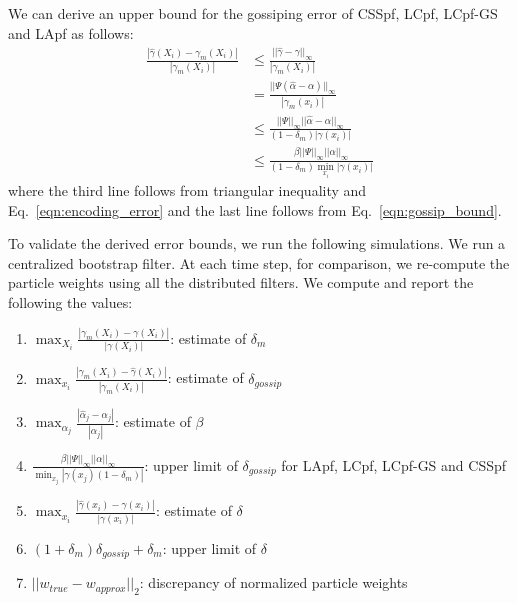\documentclass[10pt,letterpaper,final]{article}
\begin{document}

We can derive an upper bound for the gossiping error of CSSpf, LCpf, LCpf-GS and LApf as follows: 
\begin{align}
\frac{|\hat{\gamma}(X_i)-\gamma_m(X_i)|}{|\gamma_m(X_i)|} &\leq  \frac{||\hat{\gamma}-\gamma ||_\infty}{|\gamma_m(X_i)|} \nonumber \\
&= \frac{||\Psi (\hat{\alpha}-\alpha) ||_\infty}{|\gamma_m(x_i)|} \nonumber \\
&\leq \frac{||\Psi||_\infty ||\hat{\alpha}-\alpha ||_\infty}{(1-\delta_m)|\gamma(x_i)|} \nonumber \\
&\leq \frac{\beta ||\Psi||_\infty ||\alpha ||_\infty}{(1-\delta_m)\min_{x_i}|\gamma(x_i)|} 
\label{eqn:gossiping_error2}
\end{align}
where the third line follows from triangular inequality and Eq.~\eqref{eqn:encoding_error} and the last line follows from Eq.~\eqref{eqn:gossip_bound}. 

To validate the derived error bounds, we run the following simulations. We run a centralized bootstrap filter. At each time step, for comparison, we re-compute the particle weights using all the distributed filters. We compute and report the following the values:
\begin{enumerate}
\item $\max_{X_i} \frac{|\gamma_{m}(X_i)-\gamma(X_i)|}{|\gamma(X_i)|}$: estimate of $\delta_m$
\item $\max_{x_i} \frac{|\gamma_m(X_i)-\hat{\gamma}(X_i)|}{|\gamma_m(X_i)|}$: estimate of $\delta_{gossip}$ 
\item $\max_{\alpha_j} \frac{\left\vert \hat{\alpha}_j -\alpha_j \right\vert}{|\alpha_j|}$: estimate of $\beta$
\item $\frac{\beta ||\Psi||_\infty ||\alpha||_\infty}{\min_{x_j}|\gamma(x_j)(1-\delta_m)|}$: upper limit of $\delta_{gossip}$ for LApf, LCpf, LCpf-GS and CSSpf
\item $\max_{x_i} \frac{|\hat{\gamma}(x_i) - \gamma(x_i)|}{|\gamma(x_i)|}$: estimate of $\delta$
\item $(1+\delta_m)\delta_{gossip} + \delta_m$: upper limit of $\delta$
\item $||w_{true}-w_{approx}||_2$: discrepancy of normalized particle weights
\end{enumerate} 
\end{document}
